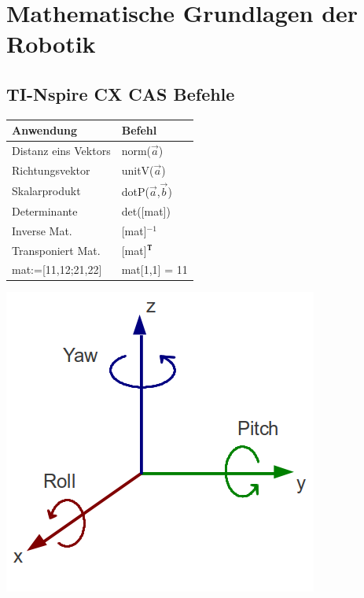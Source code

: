 \section{Mathematische Grundlagen der Robotik }
\subsection{TI-Nspire CX CAS Befehle}
\begin{minipage}{0.4\linewidth}
\begin{tabular}{ll}
    \textbf{Anwendung} & \textbf{Befehl}\\ \hline
    Distanz eins Vektors & norm($\vec{a}$)\\
    Richtungsvektor & unitV($\vec{a}$)\\
    Skalarprodukt & dotP($\vec{a}$,$\vec{b}$)\\
    Determinante & det([mat])\\
    Inverse Mat. & [mat]${}^{-1}$\\
    Transponiert Mat. & [mat]${}^{\small \textbf{T}}$\\
    mat:=[11,12;21,22] & mat[1,1] = 11\\
\end{tabular}
    \includegraphics[width=0.7\linewidth]{./bilder/koordsys}
\end{minipage}
